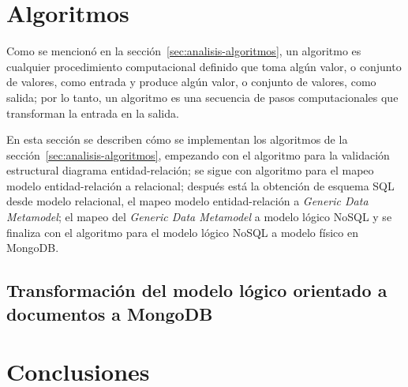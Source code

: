 \section{Algoritmos}
Como se mencionó en la sección~\ref{sec:analisis-algoritmos}, un algoritmo es cualquier procedimiento computacional definido que toma algún valor, o conjunto de valores, como entrada y produce algún valor, o conjunto de valores, como salida; por lo tanto, un algoritmo es una secuencia de pasos computacionales que transforman la entrada en la salida.


En esta sección se describen cómo se implementan los algoritmos de la sección~\ref{sec:analisis-algoritmos}, empezando con el algoritmo para la validación estructural diagrama entidad-relación; se sigue con algoritmo para el mapeo modelo entidad-relación a relacional; después está la obtención de esquema SQL desde modelo relacional, el mapeo modelo entidad-relación a \textit{Generic Data Metamodel}; el mapeo del \textit{Generic Data Metamodel} a modelo lógico NoSQL y se finaliza con el algoritmo para el modelo lógico NoSQL a modelo físico en MongoDB.




\subsection{Transformación del modelo lógico orientado a documentos a MongoDB}


\section{Conclusiones}
